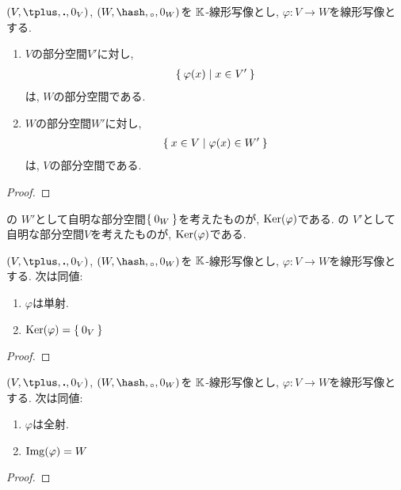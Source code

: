 \begin{prop}
  \label{subspace:prop:img:inverseimage}
  $(V,\plus,\act,0_V)$,
  $(W,\pplus,\aact,0_W)$を
  $\mathbb{K}$-線形写像とし,
  $\varphi\colon V\to W$を線形写像とする.
  \begin{enumerate}
  \item
    $V$の部分空間$V'$に対し,
    \begin{align*}
      \Set{\varphi(x)|x\in V'}
    \end{align*}
    は, $W$の部分空間である.
  \item
    $W$の部分空間$W'$に対し,
    \begin{align*}
      \Set{x\in V|\varphi(x)\in W'}
    \end{align*}
    は, $V$の部分空間である.
  \end{enumerate}
\end{prop}
\begin{proof}\end{proof}
\begin{remark}
  の
  $W'$として自明な部分空間$\Set{0_W}$を考えたものが,
  $\operatorname{Ker}(\varphi)$である.
  の
  $V'$として自明な部分空間$V$を考えたものが,
  $\operatorname{Ker}(\varphi)$である.
\end{remark}

\begin{prop}
  $(V,\plus,\act,0_V)$,
  $(W,\pplus,\aact,0_W)$を
  $\mathbb{K}$-線形写像とし,
  $\varphi\colon V\to W$を線形写像とする.
  次は同値:
  \begin{enumerate}
  \item $\varphi$は単射.
  \item $\operatorname{Ker}(\varphi)=\Set{0_V}$
  \end{enumerate}
\end{prop}
\begin{proof}\end{proof}

\begin{prop}
  $(V,\plus,\act,0_V)$,
  $(W,\pplus,\aact,0_W)$を
  $\mathbb{K}$-線形写像とし,
  $\varphi\colon V\to W$を線形写像とする.
  次は同値:
  \begin{enumerate}
  \item $\varphi$は全射.
  \item $\operatorname{Img}(\varphi)=W$
  \end{enumerate}
\end{prop}
\begin{proof}\end{proof}

